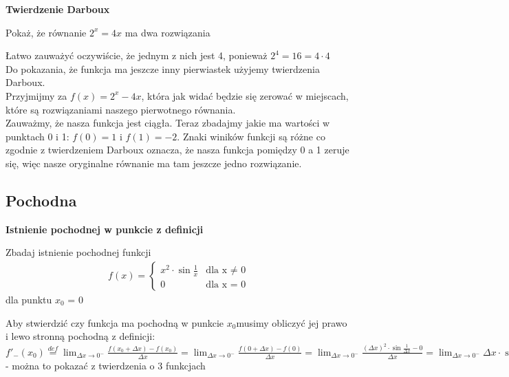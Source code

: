 \documentclass[main.tex]{subfiles}
\begin{document}
    \noindent \textbf{Twierdzenie Darboux}

    \begin{exercise}
        Pokaż, że równanie $2^x = 4x$ ma dwa rozwiązania
    \end{exercise}

    \noindent Łatwo zauważyć oczywiście, że jednym z nich jest 4, ponieważ $2^4 = 16 = 4 \cdot 4$ \\

    \noindent Do pokazania, że funkcja ma jeszcze inny pierwiastek użyjemy twierdzenia Darboux. \\
    Przyjmijmy za $f(x) = 2^x - 4x$, która jak widać będzie się zerować w miejscach, które są rozwiązaniami naszego pierwotnego równania. \\
    Zauważmy, że nasza funkcja jest ciągła. Teraz zbadajmy jakie ma wartości w punktach 0 i 1: $f(0) = 1$ i $f(1) = -2$. Znaki winików funkcji są różne co zgodnie z twierdzeniem Darboux oznacza,
    że nasza funkcja pomiędzy 0 a 1 zeruje się, więc nasze oryginalne równanie ma tam jeszcze jedno rozwiązanie.


    \subsection{Pochodna}

    \textbf{Istnienie pochodnej w punkcie z definicji} \\

    \begin{exercise}
        Zbadaj istnienie pochodnej funkcji
        \begin{align*}
            f(x) =
            \begin{cases}
                x^2 \cdot \sin{\frac{1}{x}} & \text{dla x $\neq$ 0} \\
                0 & \text{dla x = 0}
            \end{cases}
        \end{align*}
        dla punktu $x_{0}$ = 0
    \end{exercise}

    \noindent Aby stwierdzić czy funkcja ma pochodną w punkcie $x_{0}$musimy obliczyć jej prawo i lewo stronną pochodną z definicji: \\

    \noindent $f'_{-}(x_{0}) \stackrel{def}{=} \lim_{\Delta x \to 0^{-}} \frac{f(x_{0} + \Delta x) - f(x_{0})}{\Delta x} = \lim_{\Delta x \to 0^{-}} \frac{f(0 + \Delta x) - f(0)}{\Delta x} = \lim_{\Delta x \to 0^{-}} \frac{(\Delta x)^2 \cdot \sin{\frac{1}{\Delta x}} - 0}{\Delta x} =
    \lim_{\Delta x \to 0^{-}} \Delta x \cdot \sin{\frac{1}{\Delta x}} = 0$ - można to pokazać z twierdzenia o 3 funkcjach \\
\end{document}
